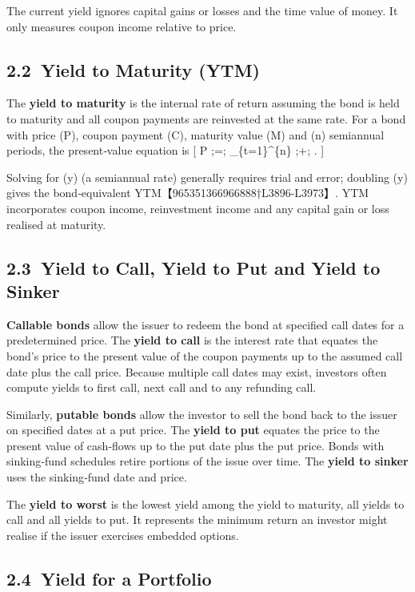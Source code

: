 \documentclass[
  letterpaper,
  DIV=11,
  numbers=noendperiod]{scrartcl}
\begin{document}
The current yield ignores capital gains or losses and the time value of
money. It only measures coupon income relative to price.

\subsection{2.2~Yield to Maturity (YTM)}\label{yield-to-maturity-ytm}

The \textbf{yield to maturity} is the internal rate of return assuming
the bond is held to maturity and all coupon payments are reinvested at
the same rate. For a bond with price (P), coupon payment (C), maturity
value (M) and (n) semiannual periods, the present‑value equation is {[}
P ;=; \sum\_\{t=1\}\^{}\{n\} ;+; . {]}

Solving for (y) (a semiannual rate) generally requires trial and error;
doubling (y) gives the bond‑equivalent
YTM【965351366966888†L3896-L3973】. YTM incorporates coupon income,
reinvestment income and any capital gain or loss realised at maturity.

\subsection{2.3~Yield to Call, Yield to Put and Yield to
Sinker}\label{yield-to-call-yield-to-put-and-yield-to-sinker}

\textbf{Callable bonds} allow the issuer to redeem the bond at specified
call dates for a predetermined price. The \textbf{yield to call} is the
interest rate that equates the bond's price to the present value of the
coupon payments up to the assumed call date plus the call price. Because
multiple call dates may exist, investors often compute yields to first
call, next call and to any refunding call.

Similarly, \textbf{putable bonds} allow the investor to sell the bond
back to the issuer on specified dates at a put price. The \textbf{yield
to put} equates the price to the present value of cash‑flows up to the
put date plus the put price. Bonds with sinking‑fund schedules retire
portions of the issue over time. The \textbf{yield to sinker} uses the
sinking‑fund date and price.

The \textbf{yield to worst} is the lowest yield among the yield to
maturity, all yields to call and all yields to put. It represents the
minimum return an investor might realise if the issuer exercises
embedded options.

\subsection{2.4~Yield for a Portfolio}\label{yield-for-a-portfolio}
\end{document}
